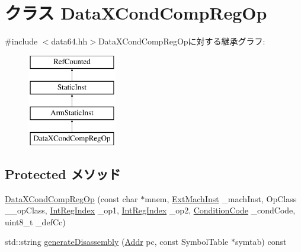 \hypertarget{classArmISA_1_1DataXCondCompRegOp}{
\section{クラス DataXCondCompRegOp}
\label{classArmISA_1_1DataXCondCompRegOp}
}


{\ttfamily \#include $<$data64.hh$>$}DataXCondCompRegOpに対する継承グラフ:\begin{figure}[H]
\begin{center}
\leavevmode
\includegraphics[height=4cm]{classArmISA_1_1DataXCondCompRegOp}
\end{center}
\end{figure}
\subsection*{Protected メソッド}
\begin{DoxyCompactItemize}
\item 
\hyperlink{classArmISA_1_1DataXCondCompRegOp_acac78d84979432cdba96853039a6edfd}{DataXCondCompRegOp} (const char $\ast$mnem, \hyperlink{classStaticInst_a5605d4fc727eae9e595325c90c0ec108}{ExtMachInst} \_\-machInst, OpClass \_\-\_\-opClass, \hyperlink{namespaceArmISA_ae64680ba9fb526106829d6bf92fc791b}{IntRegIndex} \_\-op1, \hyperlink{namespaceArmISA_ae64680ba9fb526106829d6bf92fc791b}{IntRegIndex} \_\-op2, \hyperlink{namespaceArmISA_ab8f08e777c4753720cff841f81da8e06}{ConditionCode} \_\-condCode, uint8\_\-t \_\-defCc)
\item 
std::string \hyperlink{classArmISA_1_1DataXCondCompRegOp_a95d323a22a5f07e14d6b4c9385a91896}{generateDisassembly} (\hyperlink{classm5_1_1params_1_1Addr}{Addr} pc, const SymbolTable $\ast$symtab) const 
\end{DoxyCompactItemize}
